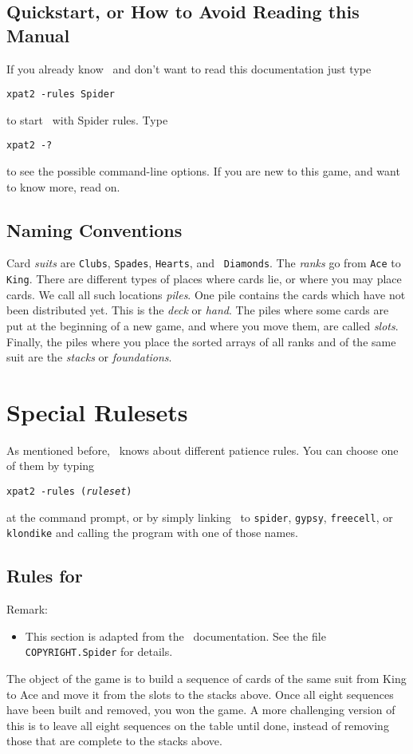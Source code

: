 \subsection{Quickstart, or How to Avoid Reading this Manual}
If you already know \spider\ and don't want to read this documentation
just type
\begin{center}
  {\tt xpat2 -rules Spider}
\end{center}
to start \xpat\ with Spider rules. Type
\begin{center}
  {\tt xpat2 -?}
\end{center}
to see the possible command-line options.
If you are new to this game, and want to know more, read on.

\subsection{Naming Conventions}
Card {\em suits} are {\tt Clubs}, {\tt Spades}, {\tt Hearts}, and {\tt
  Diamonds}.  The {\em ranks} go from {\tt Ace} to {\tt King}.
There are different types of places where cards lie, or where you may
place cards. We call all such locations {\em piles}.
One pile contains the cards which have not been distributed yet. This
is the {\em deck} or {\em hand}.
The piles where some cards are put at the beginning of a new game, and
where you move them, are called {\em slots}. Finally, the piles
where you place the sorted arrays of all ranks and of the same suit are
the {\em stacks} or {\em foundations}.

\section{Special Rulesets}
As mentioned before, \xpat\ knows about different patience rules.
You can choose one of them by typing
\begin{center}
  {\tt xpat2 -rules ({\em ruleset\/})}
\end{center}
at the command prompt, or by simply linking \xpat\ to {\tt spider},
{\tt gypsy}, {\tt freecell}, or {\tt klondike} and calling the program with one
of those names.

\subsection{Rules for \spider}

Remark:
\begin{itemize}
\item This section is adapted from the \spider\ documentation. See the file
  {\tt COPYRIGHT.Spider} for details.
\end{itemize}
The object of the game is to build a sequence of cards of the same suit from
King to Ace and move it from the slots to the stacks above.  Once
all eight sequences have been built and removed, you won the game.  A
more challenging version of this is to leave all eight sequences on the table
until done, instead of removing those that are complete to the stacks above.

